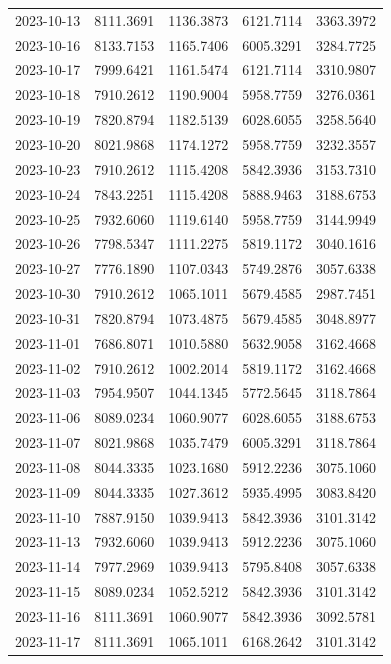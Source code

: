 \begin{footnotesize}
\begin{longtable}{lllll}
2023-10-13 & 8111.3691 & 1136.3873 & 6121.7114 & 3363.3972 \\
2023-10-16 & 8133.7153 & 1165.7406 & 6005.3291 & 3284.7725 \\
2023-10-17 & 7999.6421 & 1161.5474 & 6121.7114 & 3310.9807 \\
2023-10-18 & 7910.2612 & 1190.9004 & 5958.7759 & 3276.0361 \\
2023-10-19 & 7820.8794 & 1182.5139 & 6028.6055 & 3258.5640 \\
2023-10-20 & 8021.9868 & 1174.1272 & 5958.7759 & 3232.3557 \\
2023-10-23 & 7910.2612 & 1115.4208 & 5842.3936 & 3153.7310 \\
2023-10-24 & 7843.2251 & 1115.4208 & 5888.9463 & 3188.6753 \\
2023-10-25 & 7932.6060 & 1119.6140 & 5958.7759 & 3144.9949 \\
2023-10-26 & 7798.5347 & 1111.2275 & 5819.1172 & 3040.1616 \\
2023-10-27 & 7776.1890 & 1107.0343 & 5749.2876 & 3057.6338 \\
2023-10-30 & 7910.2612 & 1065.1011 & 5679.4585 & 2987.7451 \\
2023-10-31 & 7820.8794 & 1073.4875 & 5679.4585 & 3048.8977 \\
2023-11-01 & 7686.8071 & 1010.5880 & 5632.9058 & 3162.4668 \\
2023-11-02 & 7910.2612 & 1002.2014 & 5819.1172 & 3162.4668 \\
2023-11-03 & 7954.9507 & 1044.1345 & 5772.5645 & 3118.7864 \\
2023-11-06 & 8089.0234 & 1060.9077 & 6028.6055 & 3188.6753 \\
2023-11-07 & 8021.9868 & 1035.7479 & 6005.3291 & 3118.7864 \\
2023-11-08 & 8044.3335 & 1023.1680 & 5912.2236 & 3075.1060 \\
2023-11-09 & 8044.3335 & 1027.3612 & 5935.4995 & 3083.8420 \\
2023-11-10 & 7887.9150 & 1039.9413 & 5842.3936 & 3101.3142 \\
2023-11-13 & 7932.6060 & 1039.9413 & 5912.2236 & 3075.1060 \\
2023-11-14 & 7977.2969 & 1039.9413 & 5795.8408 & 3057.6338 \\
2023-11-15 & 8089.0234 & 1052.5212 & 5842.3936 & 3101.3142 \\
2023-11-16 & 8111.3691 & 1060.9077 & 5842.3936 & 3092.5781 \\
2023-11-17 & 8111.3691 & 1065.1011 & 6168.2642 & 3101.3142 \\

\end{longtable}
\end{footnotesize}
